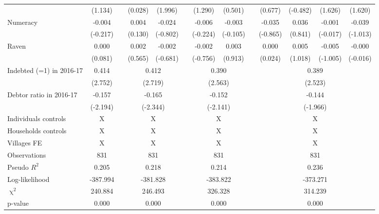 \begin{table}[htbp]
{\begin{tabular}{lcccccccccccc}
          & (1.134) &       & (0.028) & (1.996) &       & (1.290) & (0.501) &       & (0.677) & (-0.482) & (1.626) & (1.620) \\
    Numeracy & -0.004 &       & 0.004 & -0.024 &       & -0.006 & -0.003 &       & -0.035 & 0.036 & -0.001 & -0.039 \\
          & (-0.217) &       & (0.130) & (-0.802) &       & (-0.224) & (-0.105) &       & (-0.865) & (0.841) & (-0.017) & (-1.013) \\
    Raven & 0.000 &       & 0.002 & -0.002 &       & -0.002 & 0.003 &       & 0.000 & 0.005 & -0.005 & -0.000 \\
          & (0.081) &       & (0.565) & (-0.681) &       & (-0.756) & (0.913) &       & (0.024) & (1.018) & (-1.005) & (-0.016) \\
\cmidrule{1-2}\cmidrule{4-5}\cmidrule{7-8}\cmidrule{10-13}    Indebted (=1) in 2016-17 & 0.414 &       & \multicolumn{2}{c}{0.412} &       & \multicolumn{2}{c}{0.390} &       & \multicolumn{4}{c}{0.389} \\
          & (2.752) &       & \multicolumn{2}{c}{(2.719)} &       & \multicolumn{2}{c}{(2.563)} &       & \multicolumn{4}{c}{(2.523)} \\
    Debtor ratio in 2016-17 & -0.157 &       & \multicolumn{2}{c}{-0.165} &       & \multicolumn{2}{c}{-0.152} &       & \multicolumn{4}{c}{-0.144} \\
          & (-2.194) &       & \multicolumn{2}{c}{(-2.344)} &       & \multicolumn{2}{c}{(-2.141)} &       & \multicolumn{4}{c}{(-1.966)} \\
    Individuals controls & X     &       & \multicolumn{2}{c}{X} &       & \multicolumn{2}{c}{X} &       & \multicolumn{4}{c}{X} \\
    Households controls & X     &       & \multicolumn{2}{c}{X} &       & \multicolumn{2}{c}{X} &       & \multicolumn{4}{c}{X} \\
    Villages FE & X     &       & \multicolumn{2}{c}{X} &       & \multicolumn{2}{c}{X} &       & \multicolumn{4}{c}{X} \\
    \midrule
    Observations & 831   &       & \multicolumn{2}{c}{831} &       & \multicolumn{2}{c}{831} &       & \multicolumn{4}{c}{831} \\
    Pseudo $R^2$ & 0.205 &       & \multicolumn{2}{c}{0.218} &       & \multicolumn{2}{c}{0.214} &       & \multicolumn{4}{c}{0.236} \\
    Log-likelihood & -387.994 &       & \multicolumn{2}{c}{-381.828} &       & \multicolumn{2}{c}{-383.822} &       & \multicolumn{4}{c}{-373.271} \\
    $\upchi^2$ & 240.884 &       & \multicolumn{2}{c}{246.493} &       & \multicolumn{2}{c}{326.328} &       & \multicolumn{4}{c}{314.239} \\
    p-value & 0.000 &       & \multicolumn{2}{c}{0.000} &       & \multicolumn{2}{c}{0.000} &       & \multicolumn{4}{c}{0.000} \\
    \bottomrule
    \end{tabular}%
	}
  \label{tab:ame_indebt}%
\end{table}%